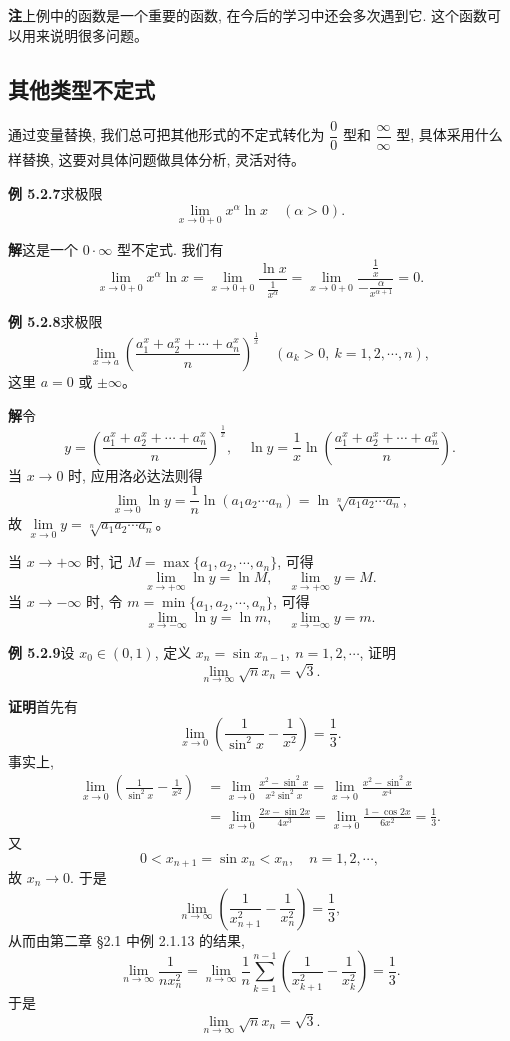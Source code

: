 \documentclass[UTF8, 12pt, fontset=fandol, oneside]{ctexart}
\begin{document}
\noindent\textbf{注}\quad 上例中的函数是一个重要的函数, 在今后的学习中还会多次遇到它. 这个函数可以用来说明很多问题。

\subsection{其他类型不定式}

通过变量替换, 我们总可把其他形式的不定式转化为 $\dfrac00$ 型和 $\dfrac\infty\infty$ 型, 具体采用什么样替换, 这要对具体问题做具体分析, 灵活对待。

\noindent\textbf{例 5.2.7}\quad 求极限
\[
  \lim_{x\to0+0}x^\alpha\ln x\quad(\alpha>0).
\]

\noindent\textbf{解}\quad 这是一个 $0\cdot\infty$ 型不定式. 我们有
\[
  \lim_{x\to0+0}x^\alpha\ln x
  =
  \lim_{x\to0+0}\frac{\ln x}{\frac1{x^\alpha}}
  =
  \lim_{x\to0+0}\frac{\frac1x}{-\frac{\alpha}{x^{\alpha+1}}}
  =
  0.
\]

\noindent\textbf{例 5.2.8}\quad 求极限
\[
  \lim_{x\to a}\left(\frac{a_1^x+a_2^x+\cdots+a_n^x}{n}\right)^{\frac1x}
  \quad (a_k>0,\ k=1,2,\cdots,n),
\]
这里 $a=0$ 或 $\pm\infty$。

\noindent\textbf{解}\quad 令
\[
  y=\left(\frac{a_1^x+a_2^x+\cdots+a_n^x}{n}\right)^{\frac1x},
  \quad
  \ln y=\frac1x\ln\left(\frac{a_1^x+a_2^x+\cdots+a_n^x}{n}\right).
\]
当 $x\to0$ 时, 应用洛必达法则得
\[
  \lim_{x\to0}\ln y
  =
  \frac1n\ln(a_1a_2\cdots a_n)
  =
  \ln\sqrt[n]{a_1a_2\cdots a_n},
\]
故 $\lim\limits_{x\to0}y=\sqrt[n]{a_1a_2\cdots a_n}$。

当 $x\to+\infty$ 时, 记 $M=\max\{a_1,a_2,\cdots,a_n\}$, 可得
\[
  \lim_{x\to+\infty}\ln y=\ln M,\quad
  \lim_{x\to+\infty}y=M.
\]
当 $x\to-\infty$ 时, 令 $m=\min\{a_1,a_2,\cdots,a_n\}$, 可得
\[
  \lim_{x\to-\infty}\ln y=\ln m,\quad
  \lim_{x\to-\infty}y=m.
\]

\noindent\textbf{例 5.2.9}\quad 设 $x_0\in(0,1)$, 定义 $x_n=\sin x_{n-1},\ n=1,2,\cdots$, 证明
\[
  \lim_{n\to\infty}\sqrt{n}x_n=\sqrt3.
\]

\noindent\textbf{证明}\quad 首先有
\[
  \lim_{x\to0}\left(\frac1{\sin^2x}-\frac1{x^2}\right)=\frac13.
\]
事实上,
\[
\begin{aligned}
  \lim_{x\to0}\left(\frac1{\sin^2x}-\frac1{x^2}\right)
  &=
  \lim_{x\to0}\frac{x^2-\sin^2x}{x^2\sin^2x}
  =
  \lim_{x\to0}\frac{x^2-\sin^2x}{x^4} \\
  &=
  \lim_{x\to0}\frac{2x-\sin2x}{4x^3}
  =
  \lim_{x\to0}\frac{1-\cos2x}{6x^2}
  =
  \frac13.
\end{aligned}
\]
又
\[
  0<x_{n+1}=\sin x_n<x_n,\quad n=1,2,\cdots,
\]
故 $x_n\to0$. 于是
\[
  \lim_{n\to\infty}\left(\frac1{x_{n+1}^2}-\frac1{x_n^2}\right)=\frac13,
\]
从而由第二章 §2.1 中例 2.1.13 的结果,
\[
  \lim_{n\to\infty}\frac1{nx_n^2}
  =
  \lim_{n\to\infty}\frac1n\sum_{k=1}^{n-1}
  \left(\frac1{x_{k+1}^2}-\frac1{x_k^2}\right)
  =
  \frac13.
\]
于是
\[
  \lim_{n\to\infty}\sqrt{n}x_n=\sqrt3.
\]
\end{document}
